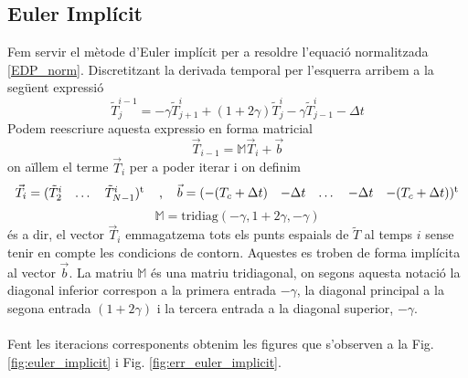 \documentclass{article}
\begin{document}
\subsection{Euler Implícit}
Fem servir el mètode d'Euler implícit \cite{Navau2024} per a resoldre l'equació normalitzada \eqref{EDP_norm}. Discretitzant la derivada temporal per l'esquerra arribem a la següent expressió
\begin{equation}\label{disc_eu_imp}
    \tilde{T}_{j}^{i-1} = -\gamma \tilde{T}_{j+1}^{i} + (1+2\gamma)\tilde{T}_{j}^{i} - \gamma\tilde{T}_{j-1}^{i} - \Delta t
\end{equation}
Podem reescriure aquesta expressio en forma matricial
\begin{equation*}
    \vec{T}_{i-1} = \mathbb{M}\vec{T}_{i} + \vec{b}
\end{equation*}
on aïllem el terme $\vec{T}_i$ per a poder iterar i on definim
\begin{equation*}
    \vec{T}_{i} = \begin{matrix} ( \tilde{T}_{2}^{i} & \dots & \tilde{T}_{N-1}^{i} )^{\text{t}} \end{matrix} \hspace{4 mm} \text{,} \hspace{4 mm} \vec{b} = \begin{matrix} ( -(T_c + \Delta t) & -\Delta t &\dots&-\Delta t & -(T_c + \Delta t) )^{\text{t}} \end{matrix} 
\end{equation*}
\begin{equation*}
    \mathbb{M} = \text{tridiag}(-\gamma,1+2\gamma,-\gamma)
\end{equation*}
és a dir, el vector $\vec{T}_{i}$ emmagatzema tots els punts espaials de $\tilde{T}$ al temps $i$ sense tenir en compte les condicions de contorn. Aquestes es troben de forma implícita al vector $\vec{b}$. La matriu $\mathbb{M}$ és una matriu tridiagonal, on segons aquesta notació la diagonal inferior correspon a la primera entrada $-\gamma$, la diagonal principal a la segona entrada $(1+2\gamma)$ i la tercera entrada a la diagonal superior, $-\gamma$.\\\\
Fent les iteracions corresponents obtenim les figures que s'observen a la Fig. \ref{fig:euler_implicit} i Fig. \ref{fig:err_euler_implicit}.
\end{document}
